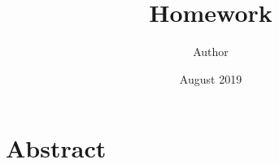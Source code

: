 \documentclass{article}
\title{\vspace{-15mm} Homework}
\author{Author}
\date{August 2019}
\begin{document}
\maketitle
\thispagestyle{fancy}

\section{Abstract}
\end{document}
